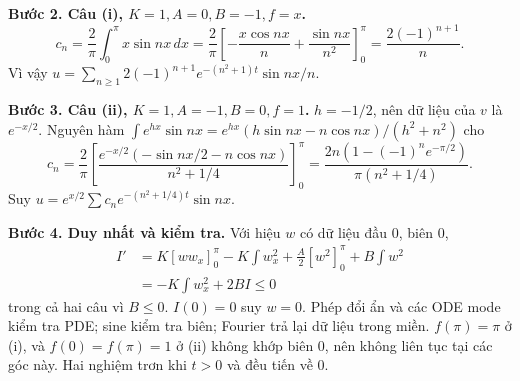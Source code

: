 \documentclass[10pt,a4paper]{article}
\begin{document}
\textbf{Bước 2. Câu (i), $K=1,A=0,B=-1,f=x$.}
\[c_n=\frac2\pi\int_0^\pi x\sin nx\,dx
=\frac2\pi\left[-\frac{x\cos nx}n+\frac{\sin nx}{n^2}\right]_0^\pi
=\frac{2(-1)^{n+1}}n.\]
Vì vậy $u=\sum_{n\ge1}2(-1)^{n+1}e^{-(n^2+1)t}\sin nx/n$.

\textbf{Bước 3. Câu (ii), $K=1,A=-1,B=0,f=1$.}
$h=-1/2$, nên dữ liệu của $v$ là $e^{-x/2}$. Nguyên hàm $\int e^{hx}\sin nx=e^{hx}(h\sin nx-n\cos nx)/(h^2+n^2)$ cho
\[c_n=\frac2\pi\left[\frac{e^{-x/2}(-\sin nx/2-n\cos nx)}{n^2+1/4}\right]_0^\pi
=\frac{2n(1-(-1)^ne^{-\pi/2})}{\pi(n^2+1/4)}.\]
Suy $u=e^{x/2}\sum c_ne^{-(n^2+1/4)t}\sin nx$.

\textbf{Bước 4. Duy nhất và kiểm tra.}
Với hiệu $w$ có dữ liệu đầu $0$, biên $0$,
\begin{align*}
I'&=K[ww_x]_0^\pi-K\int w_x^2+\frac A2[w^2]_0^\pi+B\int w^2\\
&=-K\int w_x^2+2BI\le0
\end{align*}
trong cả hai câu vì $B\le0$. $I(0)=0$ suy $w=0$. Phép đổi ẩn và các ODE mode kiểm tra PDE; sine kiểm tra biên; Fourier trả lại dữ liệu trong miền. $f(\pi)=\pi$ ở (i), và $f(0)=f(\pi)=1$ ở (ii) không khớp biên $0$, nên không liên tục tại các góc này. Hai nghiệm trơn khi $t>0$ và đều tiến về $0$.
\end{document}
